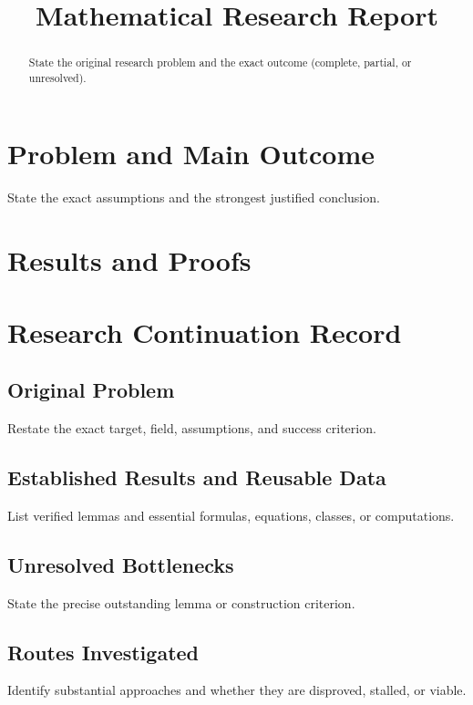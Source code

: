 \documentclass[11pt]{article}
\title{Mathematical Research Report}
\author{}
\date{}
\newtheorem{theorem}{Theorem}[section]
\theoremstyle{definition}
\begin{document}
\maketitle

\begin{abstract}
State the original research problem and the exact outcome (complete, partial, or unresolved).
\end{abstract}

\section{Problem and Main Outcome}
State the exact assumptions and the strongest justified conclusion.

\section{Results and Proofs}

\section{Research Continuation Record}

\subsection*{Original Problem}
Restate the exact target, field, assumptions, and success criterion.

\subsection*{Established Results and Reusable Data}
List verified lemmas and essential formulas, equations, classes, or computations.

\subsection*{Unresolved Bottlenecks}
State the precise outstanding lemma or construction criterion.

\subsection*{Routes Investigated}
Identify substantial approaches and whether they are disproved, stalled, or viable.
\end{document}
